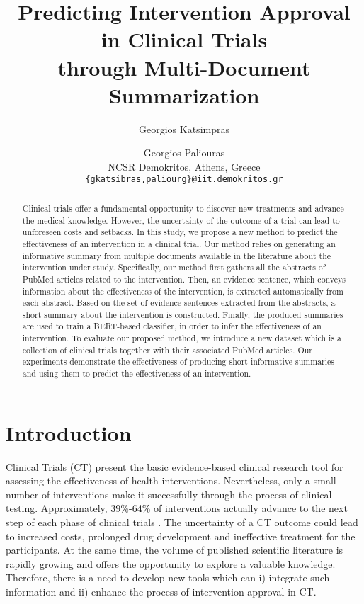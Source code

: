 \documentclass[11pt]{article}
\title{Predicting Intervention Approval in Clinical Trials \\ through Multi-Document Summarization}
\author{Georgios Katsimpras \and Georgios Paliouras \\
  NCSR Demokritos, Athens, Greece \\
  \texttt{\{gkatsibras,paliourg\}@iit.demokritos.gr} \\}%
\begin{document}
\maketitle
\begin{abstract}

Clinical trials offer a fundamental opportunity to discover new treatments and advance the medical knowledge. 
However, the uncertainty of the outcome of a trial can lead to unforeseen costs and setbacks. In this study, we propose a new method to predict the effectiveness of an intervention in a clinical trial. Our method relies on generating an informative summary from multiple documents available in the literature about the intervention under study. Specifically, our method first gathers all the abstracts of PubMed articles related to the intervention. Then, an evidence sentence, which conveys information about the effectiveness of the intervention, is extracted automatically from each abstract. Based on the set of evidence sentences extracted from the abstracts, a short summary about the intervention is constructed. Finally, the produced summaries are used to train a BERT-based classifier, in order to infer the effectiveness of an intervention. 
To evaluate our proposed method, we introduce a new dataset which is a collection of clinical trials together with their associated PubMed articles.
Our experiments demonstrate the effectiveness of producing short informative summaries and using them to predict the effectiveness of an intervention. 
\end{abstract}

\section{Introduction}
Clinical Trials (CT) present the basic evidence-based clinical research tool for assessing the effectiveness of health interventions. Nevertheless, only a small number of interventions make it successfully through the process of clinical testing. Approximately, 39\%-64\% of interventions actually advance to the next step of each phase of clinical trials \cite{dimasi2010trends}. The uncertainty of a CT outcome could lead to increased costs, prolonged drug development and ineffective treatment for the participants.
At the same time, the volume of published scientific literature is rapidly growing and offers the opportunity to explore a valuable knowledge. Therefore, there is a need to develop new tools which can i) integrate such information and ii) enhance the process of intervention approval in CT.
\end{document}

